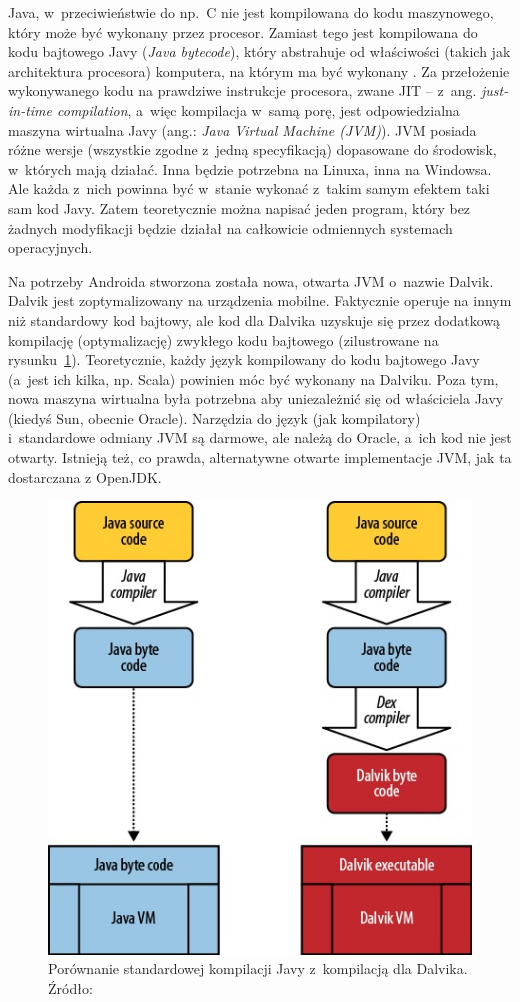 Java, w~przeciwieństwie do np.~C nie jest kompilowana do kodu maszynowego, który może być wykonany przez procesor. Zamiast tego jest kompilowana do kodu bajtowego Javy (\emph{Java bytecode}), który abstrahuje od właściwości (takich jak architektura procesora) komputera, na którym ma być wykonany \cite{jvm}. Za przełożenie wykonywanego kodu na prawdziwe instrukcje procesora, zwane JIT -- z~ang. \emph{just-in-time compilation}, a~więc kompilacja w~samą porę, jest odpowiedzialna maszyna wirtualna Javy (ang.: \emph{Java Virtual Machine (JVM)}). JVM posiada różne wersje (wszystkie zgodne z~jedną specyfikacją) dopasowane do środowisk, w~których mają działać. Inna będzie potrzebna na Linuxa, inna na Windowsa. Ale każda z~nich powinna być w~stanie wykonać z~takim samym efektem taki sam kod Javy. Zatem teoretycznie można napisać jeden program, który bez żadnych modyfikacji będzie działał na całkowicie odmiennych systemach operacyjnych.

Na potrzeby Androida stworzona została nowa, otwarta JVM o~nazwie Dalvik. Dalvik jest zoptymalizowany na urządzenia mobilne. Faktycznie operuje na innym niż standardowy kod bajtowy, ale kod dla Dalvika uzyskuje się przez dodatkową kompilację (optymalizację) zwykłego kodu bajtowego (zilustrowane na rysunku~\ref{fig:dalvik-compilation}). Teoretycznie, każdy język kompilowany do kodu bajtowego Javy (a~jest ich kilka, np. Scala) powinien móc być wykonany na Dalviku.
Poza tym, nowa maszyna wirtualna była potrzebna aby uniezależnić się od właściciela Javy (kiedyś Sun, obecnie Oracle). Narzędzia do język (jak kompilatory) i~standardowe odmiany JVM są darmowe, ale należą do Oracle, a~ich kod nie jest otwarty. Istnieją też, co prawda, alternatywne otwarte implementacje JVM, jak ta dostarczana z OpenJDK.

\begin{figure}
	\centering
		\includegraphics[scale=0.75]{img/dalvik-compilation.jpg}
	\caption{Porównanie standardowej kompilacji Javy z~kompilacją dla Dalvika. Źródło: \cite{learning-android}}
	\label{fig:dalvik-compilation}
\end{figure}

